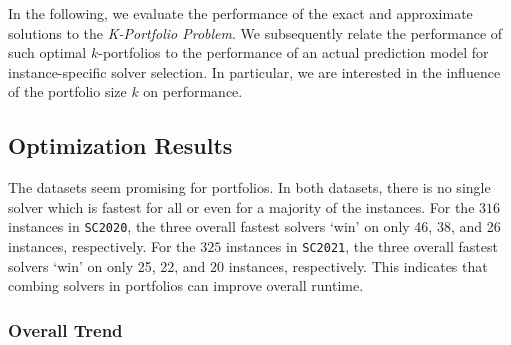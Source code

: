 \documentclass[conference]{IEEEtran}
\begin{document}
In the following, we evaluate the performance of the exact and approximate solutions to the \emph{K-Portfolio Problem}. 
We subsequently relate the performance of such optimal $k$-portfolios to the performance of an actual prediction model for instance-specific solver selection. 
In particular, we are interested in the influence of the portfolio size $k$ on performance. 

\subsection{Optimization Results}

The datasets seem promising for portfolios.
In both datasets, there is no single solver which is fastest for all or even for a majority of the instances.
For the $316$ instances in \texttt{SC2020}, the three overall fastest solvers `win' on only 46, 38, and 26 instances, respectively.
For the $325$ instances in \texttt{SC2021}, the three overall fastest solvers `win' on only 25, 22, and 20 instances, respectively.
This indicates that combing solvers in portfolios can improve overall runtime.

\subsubsection{Overall Trend}
\end{document}
